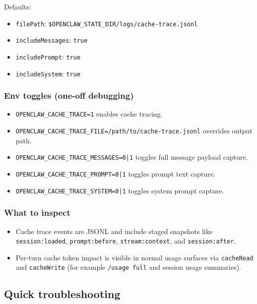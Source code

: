 Defaults:

\begin{itemize}
  \item \texttt{filePath}: \texttt{\$OPENCLAW\_STATE\_DIR/logs/cache-trace.jsonl}
  \item \texttt{includeMessages}: \texttt{true}
  \item \texttt{includePrompt}: \texttt{true}
  \item \texttt{includeSystem}: \texttt{true}
\end{itemize}


\subsubsection{Env toggles (one-off debugging)}


\begin{itemize}
  \item \texttt{OPENCLAW\_CACHE\_TRACE=1} enables cache tracing.
  \item \texttt{OPENCLAW\_CACHE\_TRACE\_FILE=/path/to/cache-trace.jsonl} overrides output path.
  \item \texttt{OPENCLAW\_CACHE\_TRACE\_MESSAGES=0|1} toggles full message payload capture.
  \item \texttt{OPENCLAW\_CACHE\_TRACE\_PROMPT=0|1} toggles prompt text capture.
  \item \texttt{OPENCLAW\_CACHE\_TRACE\_SYSTEM=0|1} toggles system prompt capture.
\end{itemize}


\subsubsection{What to inspect}


\begin{itemize}
  \item Cache trace events are JSONL and include staged snapshots like \texttt{session:loaded}, \texttt{prompt:before}, \texttt{stream:context}, and \texttt{session:after}.
  \item Per-turn cache token impact is visible in normal usage surfaces via \texttt{cacheRead} and \texttt{cacheWrite} (for example \texttt{/usage full} and session usage summaries).
\end{itemize}


\subsection{Quick troubleshooting}


